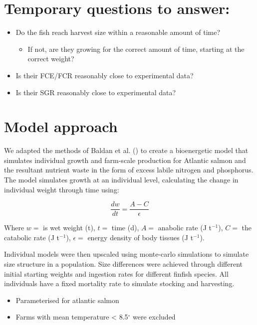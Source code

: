 \documentclass[
  a4paper,
]{article}
\providecommand{\tightlist}{%
  \setlength{\itemsep}{0pt}\setlength{\parskip}{0pt}}\usepackage{longtable,booktabs,array}
\begin{document}
\section{Temporary questions to
answer:}\label{temporary-questions-to-answer}

\begin{itemize}
\tightlist
\item
  Do the fish reach harvest size within a reasonable amount of time?

  \begin{itemize}
  \tightlist
  \item
    If not, are they growing for the correct amount of time, starting at
    the correct weight?
  \end{itemize}
\item
  Is their FCE/FCR reasonably close to experimental data?
\item
  Is their SGR reasonably close to experimental data?
\end{itemize}

\section{Model approach}\label{model-approach}

We adapted the methods of Baldan et al.
() to create a bioenergetic model that
simulates individual growth and farm-scale production for Atlantic
salmon and the resultant nutrient waste in the form of excess labile
nitrogen and phosphorus. The model simulates growth at an individual
level, calculating the change in individual weight through time using:

\[
\frac{dw}{dt} = \frac{A-C}{\epsilon}
\]

Where \(w=\) is wet weight (t), \(t=\) time (d), \(A=\) anabolic rate (J
t\(^{-1}\)), \(C=\) the catabolic rate (J t\(^{-1}\)), \(\epsilon=\)
energy density of body tissues (J t\(^{-1}\)).

Individual models were then upscaled using monte-carlo simulations to
simulate size structure in a population. Size differences were achieved
through different initial starting weights and ingestion rates for
different finfish species. All individuals have a fixed mortality rate
to simulate stocking and harvesting.

\begin{itemize}
\tightlist
\item
  Parameterised for atlantic salmon
\item
  Farms with mean temperature \textless{} 8.5\(^\circ\) were excluded
\end{itemize}
\end{document}
